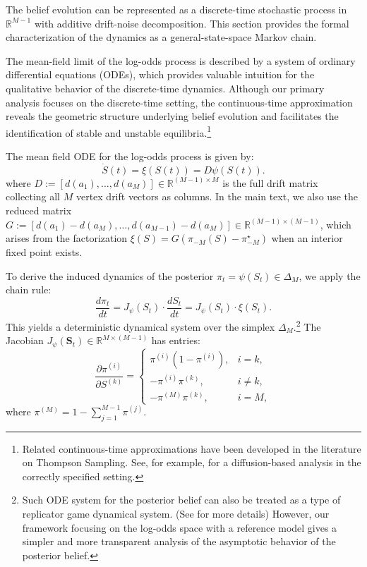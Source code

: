 \documentclass[12pt]{article}
\begin{document}
The belief evolution can be represented as a discrete-time stochastic process in $\mathbb{R}^{M-1}$ with additive drift-noise decomposition. This section provides the formal characterization of the dynamics as a general-state-space Markov chain.

The mean-field limit of the log-odds process is described by a system of ordinary differential equations (ODEs), which provides valuable intuition for the qualitative behavior of the discrete-time dynamics. Although our primary analysis focuses on the discrete-time setting, the continuous-time approximation reveals the geometric structure underlying belief evolution and facilitates the identification of stable and unstable equilibria.\footnote{Related continuous-time approximations have been developed in the literature on Thompson Sampling. See, for example, \citet{fanDiffusionApproximationsThompson2025} for a diffusion-based analysis in the correctly specified setting.}

The mean field ODE for the log-odds process is given by:
\begin{equation}
    \dot{S}(t) = \xi(S(t)) = D\psi(S(t)).
    \label{eq:ode-log-odds}
\end{equation}  
where $D := [d(a_1), \ldots, d(a_{M})] \in \mathbb{R}^{(M-1) \times M}$ is the full drift matrix collecting all $M$ vertex drift vectors as columns. In the main text, we also use the reduced matrix $G := [d(a_1)-d(a_M), \ldots, d(a_{M-1})-d(a_M)] \in \mathbb{R}^{(M-1) \times (M-1)}$, which arises from the factorization $\xi(S) = G(\pi_{-M}(S) - \pi_{-M}^\star)$ when an interior fixed point exists.

To derive the induced dynamics of the posterior \( \pi_t = \psi(S_t) \in \Delta_M \), we apply the chain rule:
\begin{equation}
\frac{d\pi_t}{dt} = J_{\psi}(S_t) \cdot \frac{dS_t}{dt} 
= J_{\psi}(S_t) \cdot \xi(S_t).
\label{eq:ode_pi}
\end{equation}
This yields a deterministic dynamical system over the simplex \( \Delta_M \).\footnote{Such ODE system for the posterior belief can also be treated as a type of replicator game dynamical system. (See \citet{shaliziDynamicsBayesianUpdating2009} for more details)  However, our framework focusing on the log-odds space with a reference model gives a simpler and more transparent analysis of the asymptotic behavior of the posterior belief. }
The Jacobian \( J_{\psi}(\mathbf{S}_t) \in \mathbb{R}^{M \times (M-1)} \) has entries:
\begin{equation}
\frac{\partial \pi^{(i)}}{\partial S^{(k)}} = 
\begin{cases}
\pi^{(i)} (1 - \pi^{(i)}), & i = k, \\
- \pi^{(i)} \pi^{(k)}, & i \neq k, \\
- \pi^{(M)} \pi^{(k)}, & i = M,
\end{cases}
\label{eq:jacobian_psi}
\end{equation}
where \( \pi^{(M)} = 1 - \sum_{j=1}^{M-1} \pi^{(j)} \).
\end{document}
